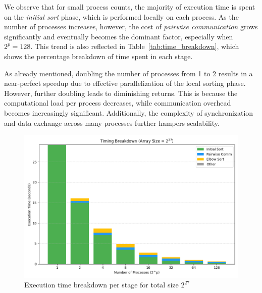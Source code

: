 \documentclass{article}
\begin{document}
We observe that for small process counts, the majority of execution time is spent on the \textit{initial sort} 
phase, which is performed locally on each process. As the number of processes increases, however, the cost of 
\textit{pairwise communication} grows significantly and eventually becomes the dominant factor, especially when 
$2^p = 128$. This trend is also reflected in Table~\ref{tab:time_breakdown}, which shows the percentage breakdown 
of time spent in each stage.

As already mentioned, doubling the number of processes from 1 to 2 results in a near-perfect speedup due to 
effective parallelization of the local sorting phase. However, further doubling leads to diminishing returns. 
This is because the computational load per process decreases, while communication overhead becomes increasingly
significant. Additionally, the complexity of synchronization and data exchange across many processes further 
hampers scalability.

\begin{figure}
    \centering
    \includegraphics[width=1\linewidth]{figures/time_breakdown.png}
    \caption{Execution time breakdown per stage for total size $2^{27}$}
    \label{fig:time_breakdown}
\end{figure}
\end{document}
